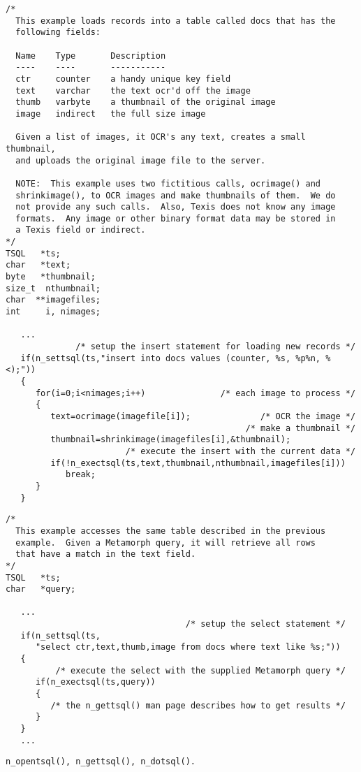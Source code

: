 \EXAMPLE
\begin{verbatim}
/*
  This example loads records into a table called docs that has the
  following fields:

  Name    Type       Description
  ----    ----       -----------
  ctr     counter    a handy unique key field
  text    varchar    the text ocr'd off the image
  thumb   varbyte    a thumbnail of the original image
  image   indirect   the full size image

  Given a list of images, it OCR's any text, creates a small thumbnail,
  and uploads the original image file to the server.

  NOTE:  This example uses two fictitious calls, ocrimage() and
  shrinkimage(), to OCR images and make thumbnails of them.  We do
  not provide any such calls.  Also, Texis does not know any image
  formats.  Any image or other binary format data may be stored in
  a Texis field or indirect.
*/
TSQL   *ts;
char   *text;
byte   *thumbnail;
size_t  nthumbnail;
char  **imagefiles;
int     i, nimages;

   ...
              /* setup the insert statement for loading new records */
   if(n_settsql(ts,"insert into docs values (counter, %s, %p%n, %<);"))
   {
      for(i=0;i<nimages;i++)               /* each image to process */
      {
         text=ocrimage(imagefile[i]);              /* OCR the image */
                                                /* make a thumbnail */
         thumbnail=shrinkimage(imagefiles[i],&thumbnail);
                        /* execute the insert with the current data */
         if(!n_exectsql(ts,text,thumbnail,nthumbnail,imagefiles[i]))
            break;
      }
   }
\end{verbatim}

\EXAMPLE
\begin{verbatim}
/*
  This example accesses the same table described in the previous
  example.  Given a Metamorph query, it will retrieve all rows
  that have a match in the text field.
*/
TSQL   *ts;
char   *query;

   ...
                                    /* setup the select statement */
   if(n_settsql(ts,
      "select ctr,text,thumb,image from docs where text like %s;"))
   {
          /* execute the select with the supplied Metamorph query */
      if(n_exectsql(ts,query))
      {
         /* the n_gettsql() man page describes how to get results */
      }
   }
   ...
\end{verbatim}

\SEE
\begin{verbatim}
n_opentsql(), n_gettsql(), n_dotsql().
\end{verbatim}

